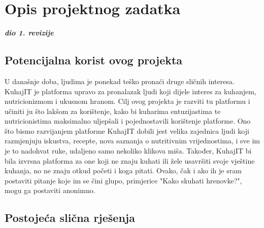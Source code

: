 \chapter{Opis projektnog zadatka}
		
		\textbf{\textit{dio 1. revizije}}\\
		
		\section{Potencijalna korist ovog projekta}

		U današnje doba, ljudima je ponekad teško pronaći druge sličnih interesa. KuhajIT je platforma upravo za pronalazak ljudi koji dijele interes za kuhanjem, nutricionizmom i ukusnom hranom. Cilj ovog projekta je razviti tu platformu i učiniti ju što lakšom za korištenje, kako bi kuharima entuzijastima te nutricionistima maksimalno uljepšali i pojednostavili korištenje platforme. Ono što bismo razvijanjem platforme KuhajIT dobili jest velika zajednica ljudi koji razmjenjuju iskustva, recepte, nova saznanja o nutritivnim vrijednostima, i sve im je to nadohvat ruke, udaljeno samo nekoliko klikova miša. Također, KuhajIT bi bila izvrsna platforma za one koji ne znaju kuhati ili žele usavršiti svoje vještine kuhanja, no ne znaju otkud početi i koga pitati. Ovako, čak i ako ih je sram postaviti pitanje koje im se čini glupo, primjerice "Kako skuhati hrenovke?", mogu ga postaviti anonimno.
		
		\section{Postojeća slična rješenja}
		
